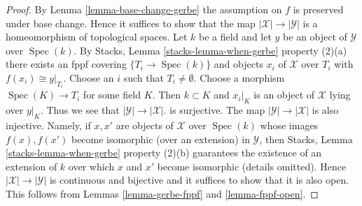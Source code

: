 \documentclass[10pt,a4paper]{amsart}
\theoremstyle{plain}
\theoremstyle{definition}
\theoremstyle{remark}
\numberwithin{equation}{subsection}
\def\Spec{\mathop{\mathrm{Spec}}}
\begin{document}
\begin{proof}
By Lemma \ref{lemma-base-change-gerbe} the assumption on $f$ is
preserved under base change. Hence it suffices to show that the map
$|\mathcal{X}| \to |\mathcal{Y}|$ is a homeomorphism of topological spaces.
Let $k$ be a field and let $y$ be an object
of $\mathcal{Y}$ over $\Spec(k)$. By
Stacks, Lemma \ref{stacks-lemma-when-gerbe} property (2)(a)
there exists an fppf covering $\{T_i \to \Spec(k)\}$
and objects $x_i$ of $\mathcal{X}$ over $T_i$ with $f(x_i) \cong y|_{T_i}$.
Choose an $i$ such that $T_i \not = \emptyset$. Choose a
morphism $\Spec(K) \to T_i$ for some field $K$.
Then $k \subset K$ and $x_i|_K$ is an object of $\mathcal{X}$ lying
over $y|_K$. Thus we see that
$|\mathcal{Y}| \to |\mathcal{X}|$. is surjective. The map
$|\mathcal{Y}| \to |\mathcal{X}|$ is also injective. Namely, if
$x, x'$ are objects of $\mathcal{X}$ over $\Spec(k)$ whose images
$f(x), f(x')$ become isomorphic (over an extension) in $\mathcal{Y}$, then
Stacks, Lemma \ref{stacks-lemma-when-gerbe} property (2)(b)
guarantees the existence of an extension of $k$ over which $x$ and $x'$
become isomorphic (details omitted).
Hence $|\mathcal{X}| \to |\mathcal{Y}|$ is continuous and bijective
and it suffices to show that it is also open.
This follows from
Lemmas \ref{lemma-gerbe-fppf} and \ref{lemma-fppf-open}.
\end{proof}
\end{document}
